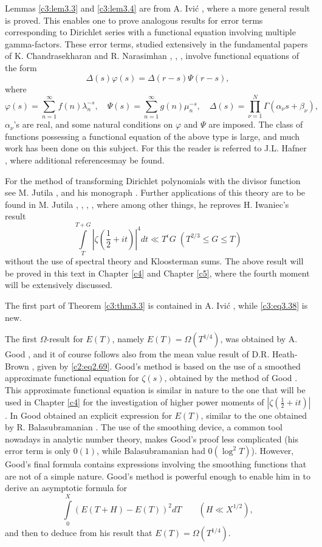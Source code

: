 Lemmas \ref{c3:lem3.3} and \ref{c3:lem3.4} are from A. Ivi\'c
\cite{Ivic4}, where a more general result is proved. This enables one to
prove analogous results for error terms corresponding to Dirichlet
series with a functional equation involving multiple
gamma-factors. These error terms, studied extensively in the
fundamental papers of K. Chandrasekharan and R. Narasimhan \cite{Chandrasekharan and  Narasimhan1},
\cite{Chandrasekharan and  Narasimhan2}, \cite{Chandrasekharan and Narasimhan3}, involve functional equations of the form
$$
   \Delta(s) \varphi (s)  = \Delta (r-s) \Psi (r-s),
$$
where
$$
  \varphi (s)  = \sum_{n=1}^\infty f(n) \lambda_n^{-s},\quad \Psi (s) =
  \sum_{n=1}^\infty g(n) \mu_n^{-s},\quad \Delta(s) = \prod_{\nu=1}^N
  \Gamma(\alpha_\nu s+ \beta_\nu),
$$
$\alpha_{\nu}$'s are real, and some natural conditions on $\varphi$
and $\Psi$ are imposed. The class of functions possessing a functional
equation of the above type is large, and much work has been done on
this subject. For this the reader is referred to J.L. Hafner \cite{Hafner2},
where additional references\pageoriginale may be found.

For the method of transforming Dirichlet polynomials with the divisor
function see M. Jutila \cite{Jutila3}, \cite{Jutila6} and his monograph
\cite{Jutila9}. Further applications of this theory are to be found in
M. Jutila \cite{Jutila10}, \cite{Jutila11}, \cite{Jutila12}, \cite{Jutila13}, where among other things, he reproves H. Iwaniec's result \cite{Iwaniec1}
$$
\int\limits_T^{T+G} \left|\zeta \left(\frac{1}{2} +
it\right)\right|^{4} dt \ll T^\epsilon G \;  
\left(T^{2/3} \leq G \leq T\right)
$$
without the use of spectral theory and Kloosterman sums. The above
result will be proved in this text in Chapter \ref{c4} and Chapter \ref{c5}, where
the fourth moment will be extensively discussed.

The first part of Theorem \ref{c3:thm3.3} is contained in A. Ivi\'c
\cite{Ivic4}, while \eqref{c3:eq3.38} is new.

The first $\Omega$-result for $E(T)$, namely $E(T)= \Omega(T^{1/4})$,
was obtained by A. Good \cite{Good3}, and it of course follows also from
the mean value result of D.R. Heath-Brown \cite{Heath-Brown2}, given by
\eqref{c2:eq2.69}. Good's method is based on the use of a smoothed
approximate functional equation for $\zeta (s)$, obtained by the
method of Good \cite{Good1}. This approximate functional equation is
similar in nature to the one that will be used in Chapter \ref{c4} for the
investigation of higher power moments of $|\zeta(\frac{1}{2}+
it)|$. In \cite{Good2} Good obtained an explicit expression for $E(T)$,
similar to the one obtained by R. Balasubramanian \cite{Balasubramanian1}. The use of
the smoothing device, a common tool nowadays in analytic number theory,
makes Good's proof less complicated (his error term is only $0(1)$,
while Balasubramanian had $0(\log ^2 T)$). However, Good's final
formula contains expressions involving the smoothing functions that
are not of a simple nature. Good's method is powerful enough to enable
him in \cite{Good3} to derive an asymptotic formula for
$$
\int\limits_{0}^X (E (T + H) - E(T))^2 dT \qquad (H \ll X^{1/2}),
$$ 
and then to deduce from his result that $E(T) = \Omega (T^{1/4})$.

